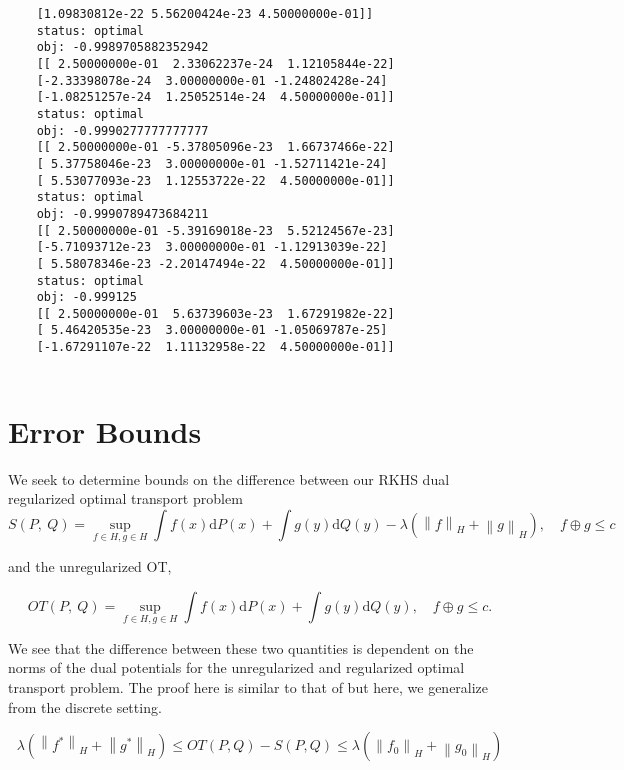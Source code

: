 \begin{lstlisting}
	[1.09830812e-22 5.56200424e-23 4.50000000e-01]]
	status: optimal
	obj: -0.9989705882352942
	[[ 2.50000000e-01  2.33062237e-24  1.12105844e-22]
	[-2.33398078e-24  3.00000000e-01 -1.24802428e-24]
	[-1.08251257e-24  1.25052514e-24  4.50000000e-01]]
	status: optimal
	obj: -0.9990277777777777
	[[ 2.50000000e-01 -5.37805096e-23  1.66737466e-22]
	[ 5.37758046e-23  3.00000000e-01 -1.52711421e-24]
	[ 5.53077093e-23  1.12553722e-22  4.50000000e-01]]
	status: optimal
	obj: -0.9990789473684211
	[[ 2.50000000e-01 -5.39169018e-23  5.52124567e-23]
	[-5.71093712e-23  3.00000000e-01 -1.12913039e-22]
	[ 5.58078346e-23 -2.20147494e-22  4.50000000e-01]]
	status: optimal
	obj: -0.999125
	[[ 2.50000000e-01  5.63739603e-23  1.67291982e-22]
	[ 5.46420535e-23  3.00000000e-01 -1.05069787e-25]
	[-1.67291107e-22  1.11132958e-22  4.50000000e-01]]
	
\end{lstlisting}

\section{Error Bounds}

We seek to determine bounds on the difference between our RKHS dual regularized optimal transport problem
$$S(P,\displaystyle \ Q)=\sup_{f\in H,g\in H}\int f(x)\mathrm{d}P(x)+\int g(y)\mathrm{d}Q(y)-\lambda(\left\|f\right\|_H+\left\|g\right\|_H),\quad f\oplus g\leq c $$

and the unregularized OT,

$$OT(P,\displaystyle \ Q)=\sup_{f\in H,g\in H}\int f(x)\mathrm{d}P(x)+\int g(y)\mathrm{d}Q(y),\quad f\oplus g\leq c. $$

We see that the difference between these two quantities is dependent on the norms of the dual potentials for the unregularized and regularized optimal transport problem. The proof here is similar to that of \cite{Sonthalia2020} but here, we generalize from the discrete setting.
\begin{theorem}
	$$
	\lambda(\left\|f^{*}\right\|_H + \left\|g^{*}\right\|_H) \leq OT(P,Q)-S(P,Q)\leq \lambda(\left\|f_0\right\|_H+\left\|g_0\right\|_H)
	$$
\end{theorem}

